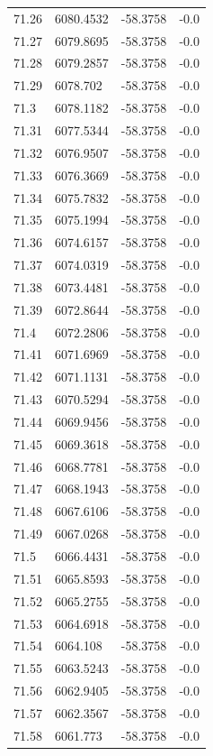 \begin{table}[H]
\begin{tabular}{llll}
71.26 & 6080.4532 & -58.3758 & -0.0 \\
71.27 & 6079.8695 & -58.3758 & -0.0 \\
71.28 & 6079.2857 & -58.3758 & -0.0 \\
71.29 & 6078.702 & -58.3758 & -0.0 \\
71.3 & 6078.1182 & -58.3758 & -0.0 \\
71.31 & 6077.5344 & -58.3758 & -0.0 \\
71.32 & 6076.9507 & -58.3758 & -0.0 \\
71.33 & 6076.3669 & -58.3758 & -0.0 \\
71.34 & 6075.7832 & -58.3758 & -0.0 \\
71.35 & 6075.1994 & -58.3758 & -0.0 \\
71.36 & 6074.6157 & -58.3758 & -0.0 \\
71.37 & 6074.0319 & -58.3758 & -0.0 \\
71.38 & 6073.4481 & -58.3758 & -0.0 \\
71.39 & 6072.8644 & -58.3758 & -0.0 \\
71.4 & 6072.2806 & -58.3758 & -0.0 \\
71.41 & 6071.6969 & -58.3758 & -0.0 \\
71.42 & 6071.1131 & -58.3758 & -0.0 \\
71.43 & 6070.5294 & -58.3758 & -0.0 \\
71.44 & 6069.9456 & -58.3758 & -0.0 \\
71.45 & 6069.3618 & -58.3758 & -0.0 \\
71.46 & 6068.7781 & -58.3758 & -0.0 \\
71.47 & 6068.1943 & -58.3758 & -0.0 \\
71.48 & 6067.6106 & -58.3758 & -0.0 \\
71.49 & 6067.0268 & -58.3758 & -0.0 \\
71.5 & 6066.4431 & -58.3758 & -0.0 \\
71.51 & 6065.8593 & -58.3758 & -0.0 \\
71.52 & 6065.2755 & -58.3758 & -0.0 \\
71.53 & 6064.6918 & -58.3758 & -0.0 \\
71.54 & 6064.108 & -58.3758 & -0.0 \\
71.55 & 6063.5243 & -58.3758 & -0.0 \\
71.56 & 6062.9405 & -58.3758 & -0.0 \\
71.57 & 6062.3567 & -58.3758 & -0.0 \\
71.58 & 6061.773 & -58.3758 & -0.0 \\

\end{tabular}
\end{table}
